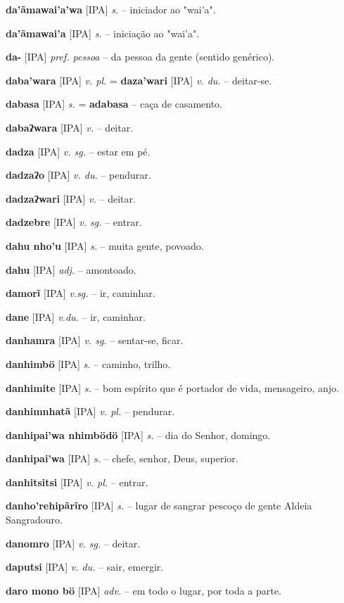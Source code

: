 \textbf{da'ãmawai'a'wa} [IPA] \textit{s.} -- iniciador ao "wai'a".

\textbf{da'ãmawai'a} [IPA] \textit{s.} -- iniciação ao "wai'a".

\textbf{da-} [IPA] \textit{pref. pessoa} -- da pessoa  da gente (sentido genérico).

\textbf{daba'wara} [IPA] \textit{v. pl.} = \textbf{daza'wari} [IPA] \textit{v. du.} -- deitar-se.

\textbf{dabasa} [IPA] \textit{s.} = \textbf{adabasa} -- caça de casamento.

\textbf{dabaʔwara} [IPA] \textit{v.} -- deitar.

\textbf{dadza} [IPA] \textit{v. sg.} -- estar em pé.

\textbf{dadzaʔo} [IPA] \textit{v. du.} -- pendurar.

\textbf{dadzaʔwari} [IPA] \textit{v.} -- deitar.

\textbf{dadzebre} [IPA] \textit{v. sg.} -- entrar.

\textbf{dahu nho'u} [IPA] \textit{s.} -- muita gente, povoado.

\textbf{dahu} [IPA] \textit{adj.} -- amontoado.

\textbf{damorĩ} [IPA] \textit{v.sg.} -- ir, caminhar.

\textbf{dane} [IPA] \textit{v.du.} -- ir, caminhar.

\textbf{danhamra} [IPA] \textit{v. sg.} -- sentar-se, ficar.

\textbf{danhimbö} [IPA] \textit{s.} -- caminho, trilho.

\textbf{danhimite} [IPA] \textit{s.} -- bom espírito que é portador de vida, mensageiro, anjo.

\textbf{danhimnhatã} [IPA] \textit{v. pl.} -- pendurar.

\textbf{danhipai'wa nhimbödö} [IPA] \textit{s.} -- dia do Senhor, domingo.

\textbf{danhipai'wa} [IPA] \textit{s.} -- chefe, senhor, Deus, superior.

\textbf{danhitsitsi} [IPA] \textit{v. pl.} -- entrar.

\textbf{danho'rehipãrĩro} [IPA] \textit{s.} -- lugar de sangrar pescoço de gente  Aldeia Sangradouro.

\textbf{danomro} [IPA] \textit{v. sg.} -- deitar.

\textbf{daputsi} [IPA] \textit{v. du.} -- sair, emergir.

\textbf{daro mono bö} [IPA] \textit{adv.} -- em todo o lugar, por toda a parte.

